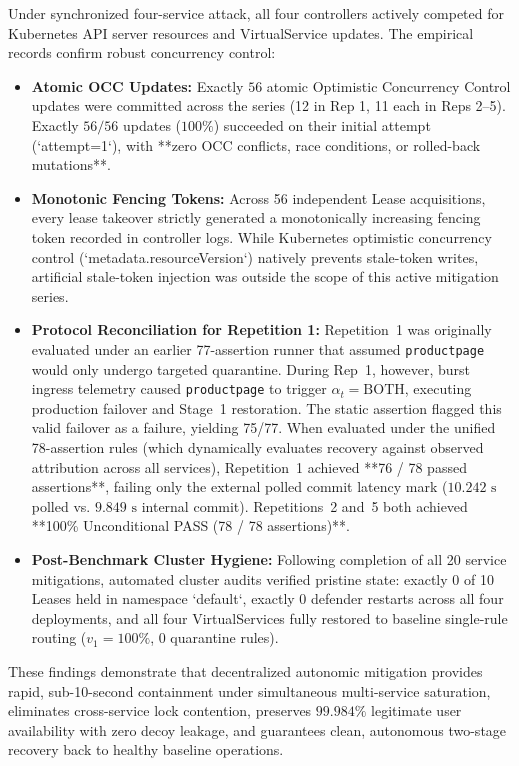 Under synchronized four-service attack, all four controllers actively competed for Kubernetes API server resources and VirtualService updates. The empirical records confirm robust concurrency control:
\begin{itemize}
    \item \textbf{Atomic OCC Updates:} Exactly $56$ atomic Optimistic Concurrency Control updates were committed across the series (12 in Rep 1, 11 each in Reps 2--5). Exactly $56 / 56$ updates ($100\%$) succeeded on their initial attempt (`attempt=1`), with **zero OCC conflicts, race conditions, or rolled-back mutations**.
    \item \textbf{Monotonic Fencing Tokens:} Across 56 independent Lease acquisitions, every lease takeover strictly generated a monotonically increasing fencing token recorded in controller logs. While Kubernetes optimistic concurrency control (`metadata.resourceVersion`) natively prevents stale-token writes, artificial stale-token injection was outside the scope of this active mitigation series.
    \item \textbf{Protocol Reconciliation for Repetition 1:} Repetition~1 was originally evaluated under an earlier 77-assertion runner that assumed \texttt{productpage} would only undergo targeted quarantine. During Rep~1, however, burst ingress telemetry caused \texttt{productpage} to trigger $\alpha_t = \text{BOTH}$, executing production failover and Stage~1 restoration. The static assertion flagged this valid failover as a failure, yielding 75/77. When evaluated under the unified 78-assertion rules (which dynamically evaluates recovery against observed attribution across all services), Repetition~1 achieved **76 / 78 passed assertions**, failing only the external polled commit latency mark ($10.242\text{ s}$ polled vs. $9.849\text{ s}$ internal commit). Repetitions~2 and~5 both achieved **100\% Unconditional PASS (78 / 78 assertions)**.
    \item \textbf{Post-Benchmark Cluster Hygiene:} Following completion of all 20 service mitigations, automated cluster audits verified pristine state: exactly 0 of 10 Leases held in namespace `default`, exactly 0 defender restarts across all four deployments, and all four VirtualServices fully restored to baseline single-rule routing ($v_1=100\%$, 0 quarantine rules).
\end{itemize}

These findings demonstrate that decentralized autonomic mitigation provides rapid, sub-10-second containment under simultaneous multi-service saturation, eliminates cross-service lock contention, preserves $99.984\%$ legitimate user availability with zero decoy leakage, and guarantees clean, autonomous two-stage recovery back to healthy baseline operations.
